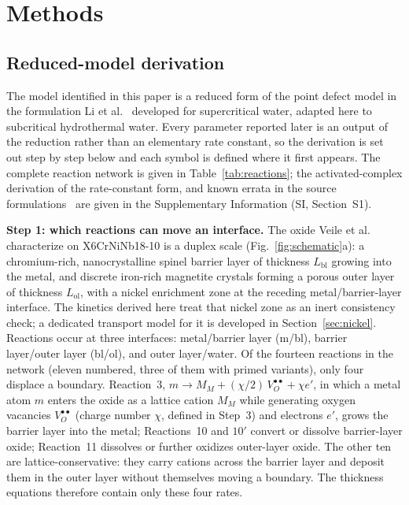 \documentclass[pdflatex,sn-nature]{sn-jnl}
\begin{document}
\section{Methods}\label{sec:methods}

\subsection{Reduced-model derivation}\label{sec:model-methods}

The model identified in this paper is a reduced form of the point defect
model in the formulation Li et al.~\citep{li2020scwpdm} developed for
supercritical water, adapted here to subcritical hydrothermal water.
Every parameter reported later is an output of the reduction rather than
an elementary rate constant, so the derivation is set out step by step
below and each symbol is defined where it first appears. The complete reaction network is given in
Table~\ref{tab:reactions}; the activated-complex derivation of the rate-constant
form, and known errata in the source
formulations~\citep{li2020scwpdm} are given in the Supplementary
Information (SI, Section~S1).

\textbf{Step 1: which reactions can move an interface.} The oxide Veile
et al.~\citep{veile2024} characterize on X6CrNiNb18-10 is a duplex scale
(Fig.~\ref{fig:schematic}a): a chromium-rich, nanocrystalline spinel
barrier layer of thickness $L_\text{bl}$ growing into the metal, and
discrete iron-rich magnetite crystals forming a porous outer layer of
thickness $L_\text{ol}$, with a nickel enrichment zone at the receding
metal/barrier-layer interface. The kinetics derived here treat that
nickel zone as an inert consistency check; a dedicated transport model
for it is developed in Section~\ref{sec:nickel}. Reactions occur at
three interfaces: metal/barrier layer (m/bl), barrier layer/outer layer
(bl/ol), and outer layer/water. Of the fourteen reactions in the network
(eleven numbered, three of them with primed variants), only four
displace a boundary. Reaction~3, $m \rightarrow M_M +
(\chi/2)\,V_O^{\bullet\bullet} + \chi e'$, in which a metal atom $m$
enters the oxide as a lattice cation $M_M$ while generating oxygen
vacancies $V_O^{\bullet\bullet}$ (charge number $\chi$, defined in
Step~3) and electrons $e'$, grows the barrier layer into the metal;
Reactions~10 and $10'$ convert or dissolve barrier-layer oxide;
Reaction~11 dissolves or further oxidizes outer-layer oxide. The other
ten are lattice-conservative: they carry cations across the barrier
layer and deposit them in the outer layer without themselves moving a
boundary. The thickness equations therefore contain only these four
rates.
\end{document}
